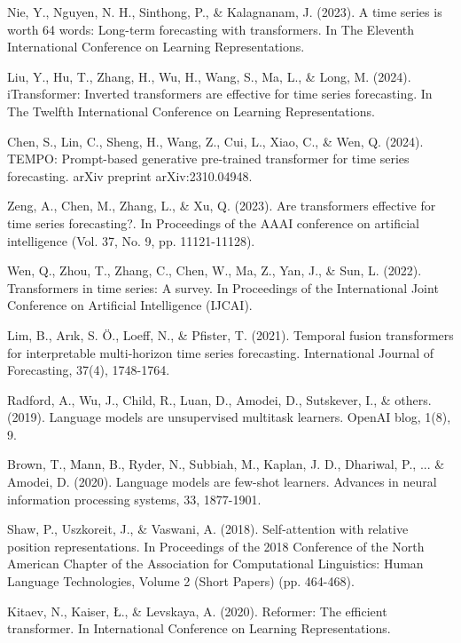 \documentclass[11pt]{article}
\begin{document}
\begin{thebibliography}{99}
Nie, Y., Nguyen, N. H., Sinthong, P., \& Kalagnanam, J. (2023). A time series is worth 64 words: Long-term forecasting with transformers. In The Eleventh International Conference on Learning Representations.

Liu, Y., Hu, T., Zhang, H., Wu, H., Wang, S., Ma, L., \& Long, M. (2024). iTransformer: Inverted transformers are effective for time series forecasting. In The Twelfth International Conference on Learning Representations.

Chen, S., Lin, C., Sheng, H., Wang, Z., Cui, L., Xiao, C., \& Wen, Q. (2024). TEMPO: Prompt-based generative pre-trained transformer for time series forecasting. arXiv preprint arXiv:2310.04948.

Zeng, A., Chen, M., Zhang, L., \& Xu, Q. (2023). Are transformers effective for time series forecasting?. In Proceedings of the AAAI conference on artificial intelligence (Vol. 37, No. 9, pp. 11121-11128).

Wen, Q., Zhou, T., Zhang, C., Chen, W., Ma, Z., Yan, J., \& Sun, L. (2022). Transformers in time series: A survey. In Proceedings of the International Joint Conference on Artificial Intelligence (IJCAI).

Lim, B., Arık, S. Ö., Loeff, N., \& Pfister, T. (2021). Temporal fusion transformers for interpretable multi-horizon time series forecasting. International Journal of Forecasting, 37(4), 1748-1764.

Radford, A., Wu, J., Child, R., Luan, D., Amodei, D., Sutskever, I., \& others. (2019). Language models are unsupervised multitask learners. OpenAI blog, 1(8), 9.

Brown, T., Mann, B., Ryder, N., Subbiah, M., Kaplan, J. D., Dhariwal, P., ... \& Amodei, D. (2020). Language models are few-shot learners. Advances in neural information processing systems, 33, 1877-1901.

Shaw, P., Uszkoreit, J., \& Vaswani, A. (2018). Self-attention with relative position representations. In Proceedings of the 2018 Conference of the North American Chapter of the Association for Computational Linguistics: Human Language Technologies, Volume 2 (Short Papers) (pp. 464-468).

Kitaev, N., Kaiser, Ł., \& Levskaya, A. (2020). Reformer: The efficient transformer. In International Conference on Learning Representations.


\end{thebibliography}
\end{document}
